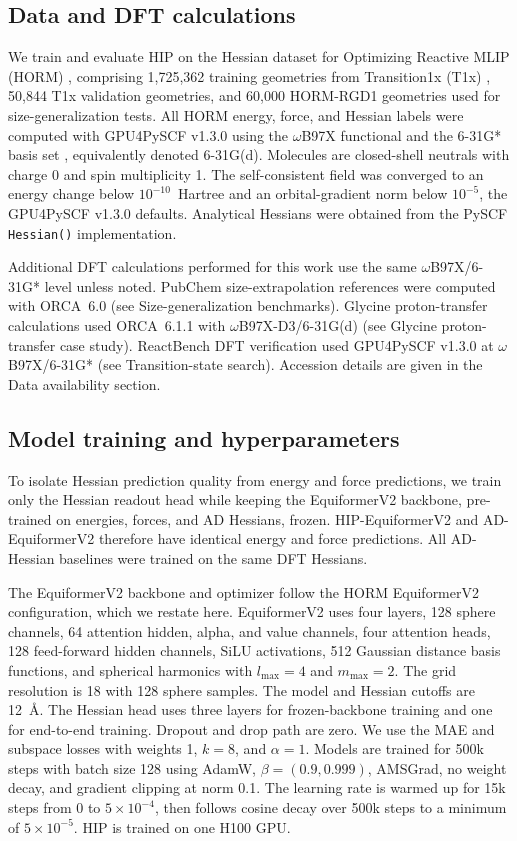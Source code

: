 \documentclass[pdflatex,sn-mathphys-num]{sn-jnl}%
\begin{document}
\subsection{Data and DFT calculations}
We train and evaluate HIP on the Hessian dataset for Optimizing Reactive MLIP (HORM) \citep{cui2025horm}, comprising 1,725,362 training geometries from Transition1x (T1x) \citep{schreiner2022transition1x}, 50,844 T1x validation geometries, and 60,000 HORM-RGD1 geometries used for size-generalization tests. All HORM energy, force, and Hessian labels were computed with GPU4PySCF v1.3.0 \citep{wu2025gpu4pyscf} using the $\omega$B97X functional \citep{chai2008wb97x} and the 6-31G* basis set \citep{ditchfield1971basis,hariharan1973polarization}, equivalently denoted 6-31G(d). Molecules are closed-shell neutrals with charge 0 and spin multiplicity 1. The self-consistent field was converged to an energy change below $10^{-10}$~Hartree and an orbital-gradient norm below $10^{-5}$, the GPU4PySCF v1.3.0 defaults. Analytical Hessians were obtained from the PySCF \texttt{Hessian()} implementation.

Additional DFT calculations performed for this work use the same $\omega$B97X/6-31G* level unless noted. PubChem size-extrapolation references were computed with ORCA~6.0 \citep{ORCA} (see Size-generalization benchmarks). Glycine proton-transfer calculations used ORCA~6.1.1 with $\omega$B97X-D3/6-31G(d) (see Glycine proton-transfer case study). ReactBench DFT verification used GPU4PySCF v1.3.0 at $\omega$B97X/6-31G* (see Transition-state search). Accession details are given in the Data availability section.

\subsection{Model training and hyperparameters}
To isolate Hessian prediction quality from energy and force predictions, we train only the Hessian readout head while keeping the EquiformerV2 backbone, pre-trained on energies, forces, and AD Hessians, frozen. HIP-EquiformerV2 and AD-EquiformerV2 therefore have identical energy and force predictions. All AD-Hessian baselines were trained on the same DFT Hessians.

The EquiformerV2 backbone and optimizer follow the HORM EquiformerV2 configuration, which we restate here. EquiformerV2 uses four layers, 128 sphere channels, 64 attention hidden, alpha, and value channels, four attention heads, 128 feed-forward hidden channels, SiLU activations, 512 Gaussian distance basis functions, and spherical harmonics with \(l_{\max}=4\) and \(m_{\max}=2\). The grid resolution is 18 with 128 sphere samples. The model and Hessian cutoffs are 12~\AA. The Hessian head uses three layers for frozen-backbone training and one for end-to-end training. Dropout and drop path are zero. We use the MAE and subspace losses with weights 1, \(k=8\), and \(\alpha=1\). Models are trained for 500k steps with batch size 128 using AdamW, \(\beta=(0.9,0.999)\), AMSGrad, no weight decay, and gradient clipping at norm 0.1. The learning rate is warmed up for 15k steps from 0 to \(5\times10^{-4}\), then follows cosine decay over 500k steps to a minimum of \(5\times10^{-5}\). HIP is trained on one H100 GPU.
\end{document}
